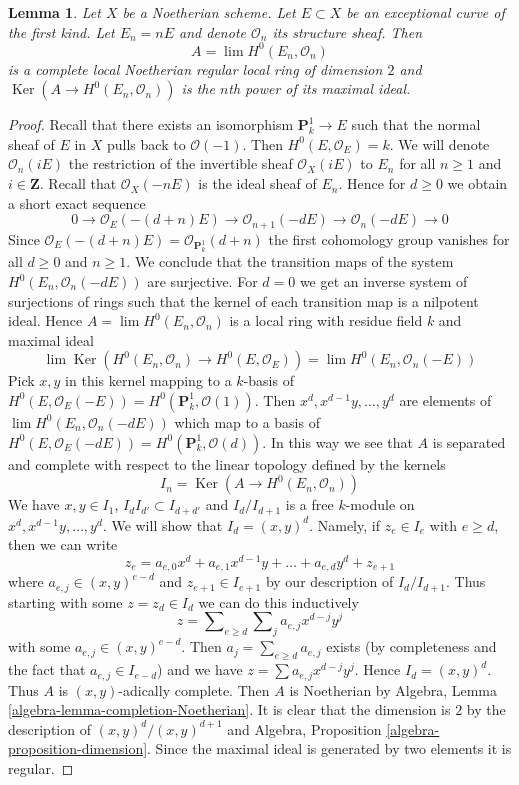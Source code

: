 \documentclass{stacks-project}
\theoremstyle{plain}
\newtheorem{lemma}[subsection]{Lemma}
\theoremstyle{definition}
\theoremstyle{remark}
\numberwithin{equation}{subsection}
\def\lim{\mathop{\mathrm{lim}}\nolimits}
\def\Ker{\mathop{\mathrm{Ker}}}
\begin{document}
\begin{lemma}
\label{lemma-exceptional-first-kind-local}
Let $X$ be a Noetherian scheme. Let $E \subset X$ be an
exceptional curve of the first kind. Let $E_n = nE$ and
denote $\mathcal{O}_n$ its structure sheaf. Then
$$
A = \lim H^0(E_n, \mathcal{O}_n)
$$
is a complete local Noetherian regular local ring of dimension $2$
and $\Ker(A \to H^0(E_n, \mathcal{O}_n))$ is the $n$th power of
its maximal ideal.
\end{lemma}

\begin{proof}
Recall that there exists an isomorphism $\mathbf{P}^1_k \to E$
such that the normal sheaf of $E$ in $X$ pulls back to $\mathcal{O}(-1)$.
Then $H^0(E, \mathcal{O}_E) = k$.
We will denote $\mathcal{O}_n(iE)$ the restriction of the invertible
sheaf $\mathcal{O}_X(iE)$ to $E_n$ for all $n \geq 1$ and $i \in \mathbf{Z}$.
Recall that $\mathcal{O}_X(-nE)$ is the ideal sheaf of $E_n$. Hence
for $d \geq 0$ we obtain a short exact sequence
$$
0 \to \mathcal{O}_E(-(d + n)E) \to
\mathcal{O}_{n + 1}(-dE) \to
\mathcal{O}_n(-dE) \to 0
$$
Since $\mathcal{O}_E(-(d + n)E) = \mathcal{O}_{\mathbf{P}^1_k}(d + n)$
the first cohomology group vanishes for all $d \geq 0$ and $n \geq 1$.
We conclude that the transition maps of the system
$H^0(E_n, \mathcal{O}_n(-dE))$ are surjective. For $d = 0$
we get an inverse system of surjections of rings such that the
kernel of each transition map is a nilpotent ideal.
Hence $A = \lim H^0(E_n, \mathcal{O}_n)$ is a local ring
with residue field $k$ and maximal ideal
$$
\lim \Ker(H^0(E_n, \mathcal{O}_n) \to H^0(E, \mathcal{O}_E)) =
\lim H^0(E_n, \mathcal{O}_n(-E))
$$
Pick $x, y$ in this kernel mapping to a $k$-basis of
$H^0(E, \mathcal{O}_E(-E)) = H^0(\mathbf{P}^1_k, \mathcal{O}(1))$.
Then $x^d, x^{d - 1}y, \ldots, y^d$ are
elements of $\lim H^0(E_n, \mathcal{O}_n(-dE))$ which map to a basis
of $H^0(E, \mathcal{O}_E(-dE)) = H^0(\mathbf{P}^1_k, \mathcal{O}(d))$.
In this way we see that $A$ is separated and complete with respect
to the linear topology defined by the kernels
$$
I_n = \Ker(A \longrightarrow H^0(E_n, \mathcal{O}_n))
$$
We have $x, y \in I_1$, $I_d I_{d'} \subset I_{d + d'}$
and $I_d/I_{d + 1}$ is a free $k$-module on $x^d, x^{d - 1}y, \ldots, y^d$.
We will show that $I_d = (x, y)^d$. Namely, if $z_e \in I_e$ with
$e \geq d$, then we can write
$$
z_e = a_{e, 0} x^d + a_{e, 1} x^{d - 1}y + \ldots + a_{e, d}y^d + z_{e + 1}
$$
where $a_{e, j} \in (x, y)^{e - d}$ and $z_{e + 1} \in I_{e + 1}$
by our description of $I_d/I_{d + 1}$. Thus starting with some
$z = z_d \in I_d$ we can do this inductively
$$
z = \sum\nolimits_{e \geq d} \sum\nolimits_j a_{e, j} x^{d - j} y^j
$$
with some $a_{e, j} \in (x, y)^{e - d}$. Then $a_j = \sum_{e \geq d} a_{e, j}$
exists (by completeness and the fact that $a_{e, j} \in I_{e - d}$)
and we have $z = \sum a_{e, j} x^{d - j} y^j$.
Hence $I_d = (x, y)^d$.
Thus $A$ is $(x, y)$-adically complete. Then $A$ is
Noetherian by Algebra, Lemma \ref{algebra-lemma-completion-Noetherian}.
It is clear that the dimension is $2$ by the description
of $(x, y)^d/(x, y)^{d + 1}$ and
Algebra, Proposition \ref{algebra-proposition-dimension}.
Since the maximal ideal
is generated by two elements it is regular.
\end{proof}
\end{document}
